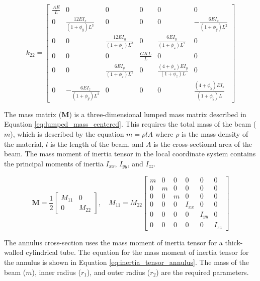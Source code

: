 \documentclass[doublespace,nopageskip]{VTthesis}
\begin{document}
			\begin{equation}
				k_{22} =
				\begin{bmatrix}
					\frac{AE}{L} & 0 & 0 & 0 & 0 & 0 \\
					0 & \frac{12 E I_z}{(1+\phi_y)L^3} & 0 & 0 & 0 & -\frac{6 E I_z}{(1+\phi_y)L^2} \\
					0 & 0 & \frac{12 E I_y}{(1+\phi_z)L^3} & 0 & \frac{6 E I_y}{(1+\phi_z)L^2} & 0 \\
					0 & 0 & 0 & \frac{G K L}{L} & 0 & 0 \\
					0 & 0 & \frac{6 E I_y}{(1+\phi_z)L^2} & 0 & \frac{(4+\phi_z) E I_y}{(1+\phi_z)L} & 0 \\
					0 & -\frac{6 E I_z}{(1+\phi_y)L^2} & 0 & 0 & 0 & \frac{(4+\phi_y) E I_z}{(1+\phi_y)L}
				\end{bmatrix}
				\label{eq:k22}
			\end{equation}
			
			
			The mass matrix ($\mathbf{M}$) is a three-dimensional lumped mass matrix described in Equation \ref{eq:lumped_mass_centered}. This requires the total mass of the beam ($m$), which is described by the equation $m = \rho l A$ where $\rho$ is the mass density of the material, $l$ is the length of the beam, and $A$ is the cross-sectional area of the beam. The mass moment of inertia tensor in the local coordinate system contains the principal moments of inertia $I_{xx}$, $I_{yy}$, and $I_{zz}$.
			
			\begin{equation} \label{eq:lumped_mass_centered}
				\mathbf{M} = \frac{1}{2}
				\begin{bmatrix}
					M_{11} & 0 \\
					0 & M_{22}
				\end{bmatrix}, \quad
				M_{11} = M_{22}
				\begin{bmatrix}
					m & 0 & 0 & 0 & 0 & 0 \\
					0 & m & 0 & 0 & 0 & 0 \\
					0 & 0 & m & 0 & 0 & 0 \\
					0 & 0 & 0 & I_{xx} & 0 & 0 \\
					0 & 0 & 0 & 0 & I_{yy} & 0 \\
					0 & 0 & 0 & 0 & 0 & I_{zz}
				\end{bmatrix}
			\end{equation}
			
			 The annulus cross-section uses the mass moment of inertia tensor for a thick-walled cylindrical tube.  The equation for the mass moment of inertia tensor for the annulus is shown in Equation \ref{eq:inertia_tensor_annulus}. The mass of the beam ($m$), inner radius ($r_1$), and outer radius ($r_2$) are the required parameters. 
			
\end{document}
